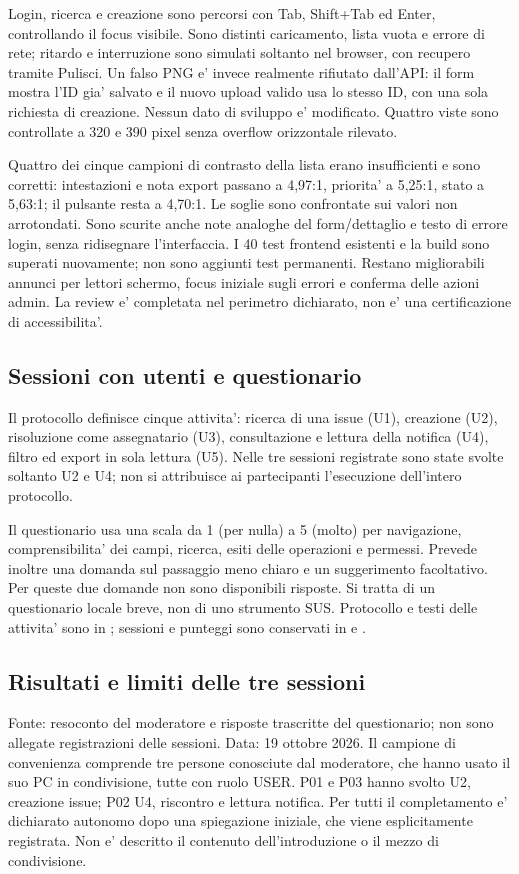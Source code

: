 \documentclass[11pt,a4paper,oneside]{report}
\begin{document}
Login, ricerca e creazione sono percorsi con Tab, Shift+Tab ed Enter,
controllando il focus visibile. Sono distinti caricamento, lista vuota e
errore di rete; ritardo e interruzione sono simulati soltanto nel browser,
con recupero tramite Pulisci. Un falso PNG e' invece realmente rifiutato
dall'API: il form mostra l'ID gia' salvato e il nuovo upload valido usa lo
stesso ID, con una sola richiesta di creazione. Nessun dato di sviluppo
e' modificato. Quattro viste sono controllate a 320 e 390 pixel senza
overflow orizzontale rilevato.

Quattro dei cinque campioni di contrasto della lista erano insufficienti
e sono corretti: intestazioni e nota export passano a 4,97:1, priorita'
a 5,25:1, stato a 5,63:1; il pulsante resta a 4,70:1. Le soglie sono
confrontate sui valori non arrotondati. Sono scurite anche note analoghe
del form/dettaglio e testo di errore login, senza ridisegnare l'interfaccia.
I 40 test frontend esistenti e la build sono superati nuovamente; non sono
aggiunti test permanenti. Restano migliorabili annunci per lettori schermo,
focus iniziale sugli errori e conferma delle azioni admin. La review e'
completata nel perimetro dichiarato, non e' una certificazione di accessibilita'.

\subsection{Sessioni con utenti e questionario}
Il protocollo definisce cinque attivita': ricerca di una issue (U1),
creazione (U2), risoluzione come assegnatario (U3), consultazione e lettura
della notifica (U4), filtro ed export in sola lettura (U5).
Nelle tre sessioni registrate sono state svolte soltanto U2 e U4;
non si attribuisce ai partecipanti l'esecuzione dell'intero protocollo.

Il questionario usa una scala da 1 (per nulla) a 5 (molto) per navigazione,
comprensibilita' dei campi, ricerca, esiti delle operazioni e permessi.
Prevede inoltre una domanda sul passaggio meno chiaro e un suggerimento
facoltativo. Per queste due domande non sono disponibili risposte.
Si tratta di un questionario locale breve, non di uno strumento SUS.
Protocollo e testi delle attivita' sono in ; sessioni e
punteggi sono conservati in  e
.

\subsection{Risultati e limiti delle tre sessioni}
Fonte: resoconto del moderatore e risposte trascritte del questionario;
non sono allegate registrazioni delle sessioni. Data: 19 ottobre 2026.
Il campione di convenienza comprende tre persone conosciute dal moderatore,
che hanno usato il suo PC in condivisione, tutte con ruolo USER. P01 e P03
hanno svolto U2, creazione issue; P02 U4, riscontro e lettura notifica.
Per tutti il completamento e' dichiarato autonomo dopo una spiegazione
iniziale, che viene esplicitamente registrata. Non e' descritto il contenuto
dell'introduzione o il mezzo di condivisione.
\end{document}
